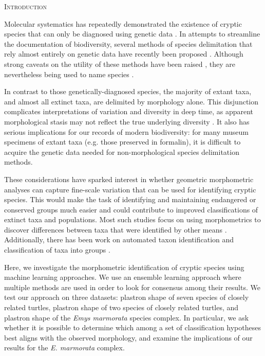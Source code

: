 \documentclass[12pt,letterpaper]{article}
\renewcommand{\section}[1]{%
\bigskip
\begin{center}
\begin{Large}
\normalfont\scshape #1
\medskip
\end{Large}
\end{center}}
\begin{document}
\section{Introduction}
Molecular systematics has repeatedly demonstrated the existence of cryptic species that can only be diagnosed using genetic data \citep{Stuart2006,Bickford2007,SchlickSteiner2007,Pfenninger2007,Clare2011,Funk2012}. In attempts to streamline the documentation of biodiversity, several methods of species delimitation that rely almost entirely on genetic data have recently been proposed \citep{Pons2006,Carstens2010,Hausdorf2010,O'Meara2010,Yang2010b,Huelsenbeck2011b}. Although strong caveats on the utility of these methods have been raised \citep{Bauer2000,Carstens2013}, they are nevertheless being used to name species \citep{Leache2010,Spinks2014}.

In contrast to those genetically-diagnosed species, the majority of extant taxa, and almost all extinct taxa, are delimited by morphology alone. This disjunction complicates interpretations of variation and diversity in deep time, as apparent morphological stasis may not reflect the true underlying diversity \citep{Eldredge1972,Gould1977a,VanBocxlaer2013}. It also has serious implications for our records of modern biodiversity: for many museum specimens of extant taxa (e.g. those preserved in formalin), it is difficult to acquire the genetic data needed for non-morphological species delimitation methods.

These considerations have sparked interest in whether geometric morphometric analyses can capture fine-scale variation that can be used for identifying cryptic species. This would make the task of identifying and maintaining endangered or conserved groups much easier and could contribute to improved classifications of extinct taxa and populations. Most such studies focus on using morphometrics to discover differences between taxa that were identified by other means \citep{Polly2003,Zelditch2004,Gaubert2005b,Gunduz2007,Polly2007a,Demandt2009,Markolf2013,Fruciano2016}. Additionally, there has been work on automated taxon identification and classification of taxa into groups \citep{Baylac2003,Dobigny2003,MacLeod2007,VandenBrink2011,Vitek2017}. 

Here, we investigate the morphometric identification of cryptic species using machine learning approaches. We use an ensemble learning approach where multiple methods are used in order to look for consensus among their results. We test our approach on three datasets: plastron shape of seven species of closely related turtles, plastron shape of two species of closely related turtles, and plastron shape of the \textit{Emys marmorata} species complex. In particular, we ask whether it is possible to determine which among a set of classification hypotheses best aligns with the observed morphology, and examine the implications of our results for the \textit{E. marmorata} complex. 
\end{document}

